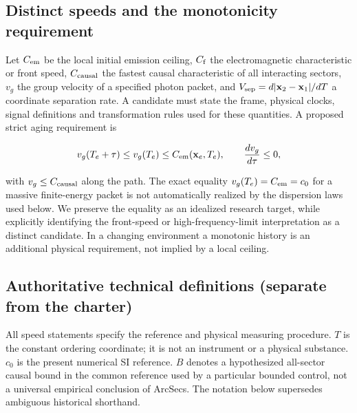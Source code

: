 \documentclass[
  11pt,
  twoside]{article}
\begin{document}
\subsection{Distinct speeds and the monotonicity
requirement}\label{distinct-speeds-and-the-monotonicity-requirement}

Let \(C_{\rm em}\) be the local initial emission ceiling, \(C_{\rm f}\)
the electromagnetic characteristic or front speed, \(C_{\rm causal}\)
the fastest causal characteristic of all interacting sectors, \(v_g\)
the group velocity of a specified photon packet, and
\(V_{\rm sep}=d|\mathbf{x}_2-\mathbf{x}_1|/dT\) a coordinate separation
rate. A candidate must state the frame, physical clocks, signal
definitions and transformation rules used for these quantities. A
proposed strict aging requirement is

\[v_g(T_e+\tau)\leq v_g(T_e)\leq C_{\rm em}(\mathbf{x}_e,T_e),\qquad \frac{dv_g}{d\tau}\leq 0,\]

with \(v_g\leq C_{\rm causal}\) along the path. The exact equality
\(v_g(T_e)=C_{\rm em}=c_0\) for a massive finite-energy packet is not
automatically realized by the dispersion laws used below. We preserve
the equality as an idealized research target, while explicitly
identifying the front-speed or high-frequency-limit interpretation as a
distinct candidate. In a changing environment a monotonic history is an
additional physical requirement, not implied by a local ceiling.

\subsection{Authoritative technical definitions (separate from the
charter)}\label{authoritative-technical-definitions-separate-from-the-charter}

All speed statements specify the reference and physical measuring
procedure. \(T\) is the constant ordering coordinate; it is not an
instrument or a physical substance. \(c_0\) is the present numerical SI
reference. \(B\) denotes a hypothesized all-sector causal bound in the
common reference used by a particular bounded control, not a universal
empirical conclusion of ArcSecs. The notation below supersedes ambiguous
historical shorthand.
\end{document}
